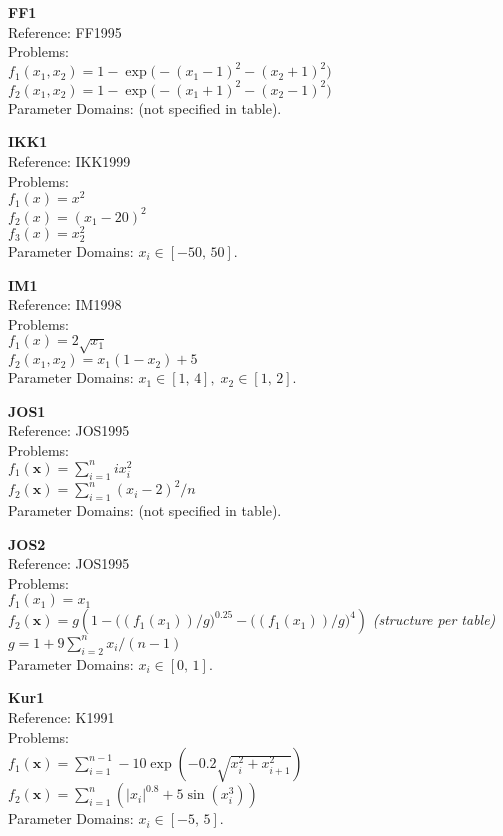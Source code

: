 \documentclass[12pt,a4paper]{article}
\begin{document}
\medskip

\textbf{FF1}\\
Reference: FF1995\\
Problems:\\
$f_1(x_1,x_2) = 1 - \exp\!\big(-(x_1-1)^2 - (x_2+1)^2\big)$\\
$f_2(x_1,x_2) = 1 - \exp\!\big(-(x_1+1)^2 - (x_2-1)^2\big)$\\
Parameter Domains: (not specified in table).

\medskip

\textbf{IKK1}\\
Reference: IKK1999\\
Problems:\\
$f_1(x) = x^2$\\
$f_2(x) = (x_1 - 20)^2$\\
$f_3(x) = x_2^2$\\
Parameter Domains: $x_i \in [-50,\,50]$.

\medskip

\textbf{IM1}\\
Reference: IM1998\\
Problems:\\
$f_1(x) = 2\sqrt{x_1}$\\
$f_2(x_1,x_2) = x_1(1 - x_2) + 5$\\
Parameter Domains: $x_1 \in [1,\,4],\; x_2 \in [1,\,2]$.

\medskip

\textbf{JOS1}\\
Reference: JOS1995\\
Problems:\\
$f_1(\mathbf{x}) = \sum_{i=1}^n ix_i^2$\\
$f_2(\mathbf{x}) = \sum_{i=1}^n (x_i - 2)^2 / n$\\
Parameter Domains: (not specified in table).

\medskip

\textbf{JOS2}\\
Reference: JOS1995\\
Problems:\\
$f_1(x_1) = x_1$\\
$f_2(\mathbf{x}) = g\!\left(1 - \big((f_1(x_1))/g\big)^{0.25} - \big((f_1(x_1))/g\big)^{4}\right)$ \quad \textit{(structure per table)}\\
$g = 1 + 9\sum_{i=2}^n x_i/(n-1)$\\
Parameter Domains: $x_i \in [0,\,1]$.

\medskip

\textbf{Kur1}\\
Reference: K1991\\
Problems:\\
$f_1(\mathbf{x}) = \sum_{i=1}^{n-1} -10 \exp\!\left(-0.2 \sqrt{x_i^2 + x_{i+1}^2}\right)$\\
$f_2(\mathbf{x}) = \sum_{i=1}^{n} \left(|x_i|^{0.8} + 5\sin(x_i^3)\right)$\\
Parameter Domains: $x_i \in [-5,\,5]$.
\end{document}
